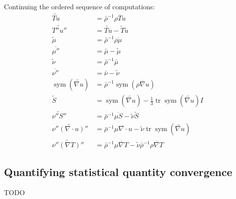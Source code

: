 \documentclass[letterpaper,11pt,nointlimits,reqno,draft]{amsart}
\newcommand{\Mach}[1][]{\ensuremath{\mbox{Ma}_{#1}}}
\newcommand{\symmetricpart}[1]
  {\ensuremath{\operatorname{sym}\left(#1\right)}}
\DeclareMathOperator{\trace}{tr}
\begin{document}
Continuing the ordered sequence of computations:
\begin{align}
  \widetilde{Tu} &= \bar{\rho}^{-1} \overline{\rho{}Tu}
\\
  \widetilde{T''u''} &= \widetilde{Tu} - \tilde{T}\tilde{u}
\\
  \tilde{\mu} &= \bar{\rho}^{-1} \overline{\rho\mu}
\\
  \overline{\mu''} &= \bar{\mu} - \tilde{\mu}
\\
  \tilde{\nu} &= \bar{\rho}^{-1} \bar{\mu}
\\
  \overline{\nu''} &= \bar{\nu} - \tilde{\nu}
\\
  \symmetricpart{\widetilde{\nabla{}u}}
  &= \bar{\rho}^{-1} \symmetricpart{\overline{\rho\nabla{}u}}
\\
  \tilde{S} &= \symmetricpart{\widetilde{\nabla{}u}}
   - \frac{1}{3} \trace\symmetricpart{\widetilde{\nabla{}u}} I
\\
  \widetilde{\nu''S''}
  &= \bar{\rho}^{-1} \overline{\mu{}S} - \tilde{\nu}\tilde{S}
\\
  \widetilde{\nu''\left(\nabla\cdot{}u\right)''}
  &= \bar{\rho}^{-1} \overline{\mu\nabla\cdot{}u}
   - \tilde{\nu}\trace\symmetricpart{\widetilde{\nabla{}u}}
\\
  \widetilde{\nu''\left(\nabla{}T\right)''}
  &= \bar{\rho}^{-1} \overline{\mu\nabla{}T}
   - \tilde{\nu} \bar{\rho}^{-1} \overline{\rho\nabla{}T}
\end{align}

\subsection{Quantifying statistical quantity convergence}
\label{sec:quantconvergence}

TODO


\newcommand*{\doi}[1]{\href{http://dx.doi.org/\detokenize{#1}}{doi: #1}}




\end{document}
